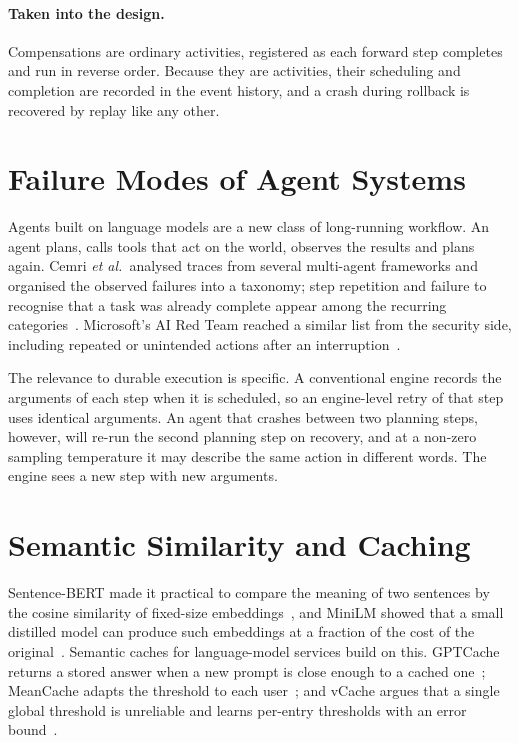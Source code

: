 \paragraph{Taken into the design.} Compensations are ordinary activities,
registered as each forward step completes and run in reverse order. Because
they are activities, their scheduling and completion are recorded in the
event history, and a crash during rollback is recovered by replay like any
other.

\section{Failure Modes of Agent Systems}

Agents built on language models are a new class of long-running workflow. An
agent plans, calls tools that act on the world, observes the results and plans
again. Cemri \emph{et al.}\ analysed traces from several multi-agent
frameworks and organised the observed failures into a taxonomy; step
repetition and failure to recognise that a task was already complete appear
among the recurring categories~\cite{whyfail2025}. Microsoft's AI Red Team
reached a similar list from the security side, including repeated or
unintended actions after an interruption~\cite{msredteam2025}.

The relevance to durable execution is specific. A conventional engine records
the arguments of each step when it is scheduled, so an engine-level retry of
that step uses identical arguments. An agent that crashes between two planning
steps, however, will re-run the second planning step on recovery, and at a
non-zero sampling temperature it may describe the same action in different
words. The engine sees a new step with new arguments.

\section{Semantic Similarity and Caching}

Sentence-BERT made it practical to compare the meaning of two sentences by the
cosine similarity of fixed-size embeddings~\cite{sbert2019}, and MiniLM showed
that a small distilled model can produce such embeddings at a fraction of the
cost of the original~\cite{minilm2020}. Semantic caches for language-model
services build on this. GPTCache returns a stored answer when a new prompt is
close enough to a cached one~\cite{gptcache2023}; MeanCache adapts the
threshold to each user~\cite{meancache2025}; and vCache argues that a single
global threshold is unreliable and learns per-entry thresholds with an error
bound~\cite{vcache2025}.

